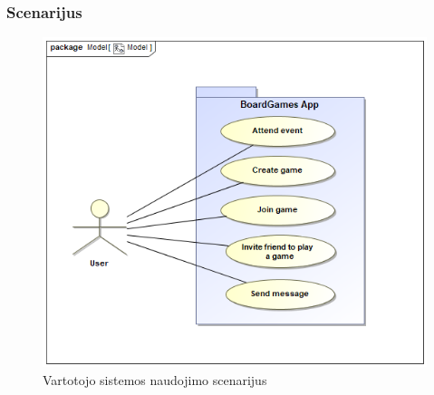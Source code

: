 \documentclass{VUMIFPSkursinis}
\begin{document}
	\subsubsection {Scenarijus}
			\begin{figure}[H]
				\centering
				\includegraphics[scale=0.5]{img/UserUseCase}
				\caption{Vartotojo sistemos naudojimo scenarijus}
				\label{img:UserUseCase}
			\end{figure}
			
\end{document}
